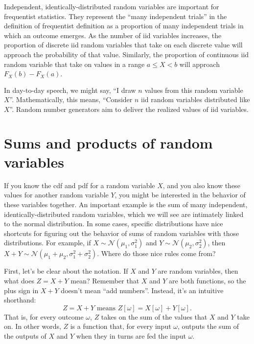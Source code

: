 Independent, identically-distributed random variables are important for
frequentist statistics. They represent the ``many independent trials''
in the definition of frequentist definition as a proportion of many
independent trials in which an outcome emerges. As the number of iid variables
increases, the proportion of discrete iid random variables that take on each
discrete value will approach the probability of that value. Similarly, the
proportion of continuous iid random variable that take on values in a range $a
\leq X < b$ will approach $F_X(b) - F_X(a)$.

In day-to-day speech, we might say, ``I draw $n$ values from this random
variable $X$''. Mathematically, this means, ``Consider $n$ iid random
variables distributed like $X$''. Random number generators  aim to deliver the
realized values of iid variables.


\section{Sums and products of random variables}

If you know the cdf and pdf for a random variable $X$, and you also know these
values for another random variable $Y$, you might be interested in the
behavior of these variables together. An important example is the sum of many
independent, identically-distributed random variables, which we will see are
intimately linked to the normal distribution. In some cases, specific distributions have
nice shortcuts for figuring out the behavior of sums of random variables with
those distributions. For example, if $X \sim \mathcal{N}(\mu_1, \sigma_1^2)$
and $Y \sim \mathcal{N}(\mu_2, \sigma_2^2)$, then $X + Y \sim
\mathcal{N}(\mu_1 + \mu_2, \sigma_1^2 + \sigma_2^2)$. Where do those nice
rules come from?

First, let's be clear about the notation. If $X$ and $Y$ are random variables,
then what does $Z = X + Y$ mean? Remember that $X$ and $Y$ are both functions,
so the plus sign in $X + Y$ doesn't mean ``add numbers''. Instead, it's an intuitive shorthand:
\begin{equation}
Z = X + Y \text{ means } Z[\omega] = X[\omega] + Y[\omega].
\end{equation}
That is, for every outcome $\omega$, $Z$ takes on the sum of the values that
$X$ and $Y$ take on. In other words, $Z$ is a function that, for every input
$\omega$, outputs the sum of the outputs of $X$ and $Y$ when they in turns are
fed the input $\omega$.


